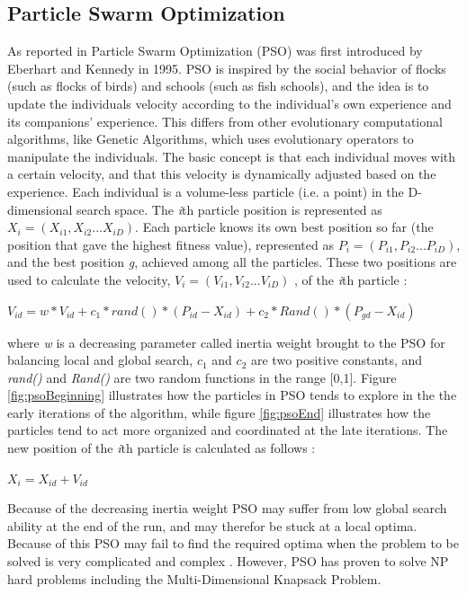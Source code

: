 \subsection{Particle Swarm Optimization}
As reported in \citet{shi99} Particle Swarm Optimization (PSO) was first introduced by Eberhart and Kennedy in 1995. PSO is inspired by the social behavior of flocks (such as flocks of birds) and schools (such as fish schools), and the idea is to update the individuals velocity according to the individual's own experience and its companions' experience. This differs from other evolutionary computational algorithms, like Genetic Algorithms, which uses evolutionary operators to manipulate the individuals. The basic concept is that each individual moves with a certain velocity, and that this velocity is dynamically adjusted based on the experience. Each individual is a volume-less particle (i.e. a point) in the D-dimensional search space. The \textit{i}th particle position is represented as $X_i = (X_{i1},X_{i2}...X_{iD})$. Each particle knows its own best position so far (the position that gave the highest fitness value), represented as $P_i = (P_{i1},P_{i2}...P_{iD})$, and the best position \textit{g}, achieved among all the particles. These two positions are used to calculate the velocity, $V_i = (V_{i1},V_{i2}...V_{iD})$ ,  of the \textit{i}th particle \citep{shi99}: 
\newline
\newline
\centerline{$V_{id} = w * V_{id} + c_1 * rand() * (P_{id}-X_{id}) + c_2 * Rand() * (P_{gd}-X_{id})$}
\newline
\newline
where \textit{w} is a decreasing parameter called inertia weight brought to the PSO for balancing local and global search, $c_1$ and $c_2$ are two positive constants, and \textit{rand()} and \textit{Rand()} are two random functions in the range [0,1]. Figure \ref{fig:psoBeginning} illustrates how the particles in PSO tends to explore in the the early iterations of the algorithm, while figure \ref{fig:psoEnd} illustrates how the particles tend to act more organized and coordinated at the late iterations. The new position of the \textit{i}th particle is calculated as follows \citep{shi99}:
\newline
\newline
\centerline{$X_i = X_{id} + V_{id}$}
\newline
\newline
Because of the decreasing inertia weight PSO may suffer from low global search ability at the end of the run, and may therefor be stuck at a local optima. Because of this PSO may fail to find the required optima when the problem to be solved is very complicated and complex \citep{shi99}. However, PSO has proven to solve NP hard problems including the Multi-Dimensional Knapsack Problem\citep{wan09}. 

